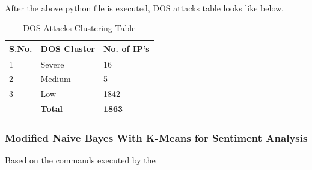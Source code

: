 \documentclass{article}
\begin{document}






\paragraph{}
After the above python file is executed, DOS attacks table looks like below.

\begin{table}[H]
\begin{tabular}{ |p{2cm}|p{5cm}|p{5cm}|  }
 \hline
 \textbf{S.No.} & \textbf{DOS Cluster} & \textbf{No. of IP's}\\
 \hline
 \hline
 1 & Severe & 16 \\
 \hline
2 & Medium & 5 \\
\hline
3 & Low & 1842 \\
\hline
\hline
 & \textbf{Total} & \textbf{1863} \\
\hline
\end{tabular}
 \caption{DOS Attacks Clustering Table}
\end{table}

\subsubsection{Modified Naive Bayes With K-Means for Sentiment Analysis}
Based on the commands executed by the 
\end{document}

